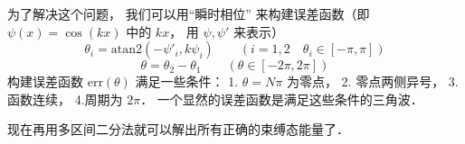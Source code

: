 为了解决这个问题， 我们可以用“瞬时相位” 来构建误差函数（即 $\psi(x) = \cos(kx)$ 中的 $kx$， 用 $\psi, \psi'$ 来表示）
\begin{equation}
\theta_i = \text{atan2}(-\psi'_i, k\psi_i) \qquad (i = 1, 2 \quad \theta_i \in [-\pi, \pi])
\end{equation}
\begin{equation}
\theta = \theta_2 - \theta_1 \qquad (\theta \in [-2\pi, 2\pi])
\end{equation}
构建误差函数 $\text{err}(\theta)$ 满足一些条件： 1. $\theta = N\pi$ 为零点， 2. 零点两侧异号， 3. 函数连续， 4.周期为 $2\pi$． 一个显然的误差函数是满足这些条件的三角波．

现在再用多区间二分法就可以解出所有正确的束缚态能量了．
